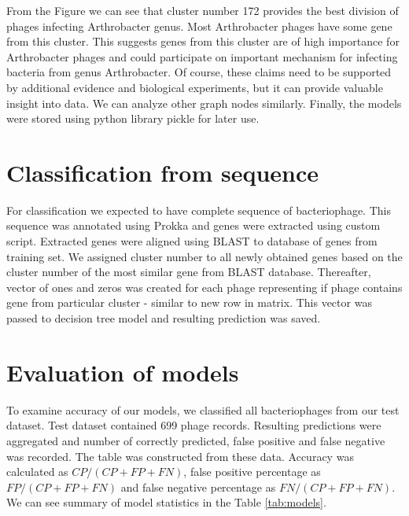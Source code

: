 From the Figure we can see that cluster number 172 provides the best division of phages infecting Arthrobacter genus.
Most Arthrobacter phages have some gene from this cluster.
This suggests genes from this cluster are of high importance for Arthrobacter phages and could participate on important mechanism for infecting bacteria from genus Arthrobacter.
Of course, these claims need to be supported by additional evidence and biological experiments, but it can provide valuable insight into data.
We can analyze other graph nodes similarly.
Finally, the models were stored using python library pickle for later use.


\section{Classification from sequence}
For classification we expected to have complete sequence of bacteriophage.
This sequence was annotated using Prokka and genes were extracted using custom script.
Extracted genes were aligned using BLAST to database of genes from training set.
We assigned cluster number to all newly obtained genes based on the cluster number of the most similar gene from BLAST database.
Thereafter, vector of ones and zeros was created for each phage representing if phage contains gene from particular cluster - similar to new row in matrix.
This vector was passed to decision tree model and resulting prediction was saved.

\section{Evaluation of models}
To examine accuracy of our models, we classified all bacteriophages from our test dataset.
Test dataset contained 699 phage records.
Resulting predictions were aggregated and number of correctly predicted, false positive and false negative was recorded.
The table was constructed from these data.
Accuracy was calculated as $CP/(CP+FP+FN)$, false positive percentage as $FP/(CP+FP+FN)$ and false negative percentage as $FN/(CP+FP+FN)$.
We can see summary of model statistics in the Table \ref{tab:models}. 

